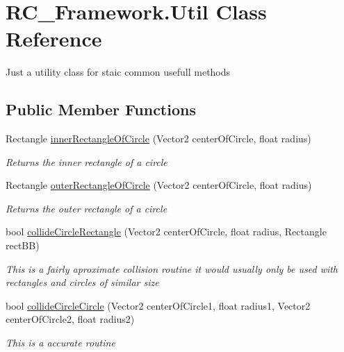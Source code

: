 \hypertarget{class_r_c___framework_1_1_util}{}\section{R\+C\+\_\+\+Framework.\+Util Class Reference}
\label{class_r_c___framework_1_1_util}


Just a utility class for staic common usefull methods  


\subsection*{Public Member Functions}
\begin{DoxyCompactItemize}
\item 
Rectangle \mbox{\hyperlink{class_r_c___framework_1_1_util_a4b3641d1c35bdd3428cb28da938b263b}{inner\+Rectangle\+Of\+Circle}} (Vector2 center\+Of\+Circle, float radius)
\begin{DoxyCompactList}\small\item\em Returns the inner rectangle of a circle \end{DoxyCompactList}\item 
Rectangle \mbox{\hyperlink{class_r_c___framework_1_1_util_acfe8d27d82ff07df93b0a0545fbc6773}{outer\+Rectangle\+Of\+Circle}} (Vector2 center\+Of\+Circle, float radius)
\begin{DoxyCompactList}\small\item\em Returns the outer rectangle of a circle \end{DoxyCompactList}\item 
bool \mbox{\hyperlink{class_r_c___framework_1_1_util_a775e3f63e6491a8ea6bd6a1a82db5531}{collide\+Circle\+Rectangle}} (Vector2 center\+Of\+Circle, float radius, Rectangle rect\+BB)
\begin{DoxyCompactList}\small\item\em This is a fairly aproximate collision routine it would usually only be used with rectangles and circles of similar size \end{DoxyCompactList}\item 
bool \mbox{\hyperlink{class_r_c___framework_1_1_util_a6cd31bdef807a78294fc65ba7806adb1}{collide\+Circle\+Circle}} (Vector2 center\+Of\+Circle1, float radius1, Vector2 center\+Of\+Circle2, float radius2)
\begin{DoxyCompactList}\small\item\em This is a accurate routine \end{DoxyCompactList}\end{DoxyCompactItemize}
